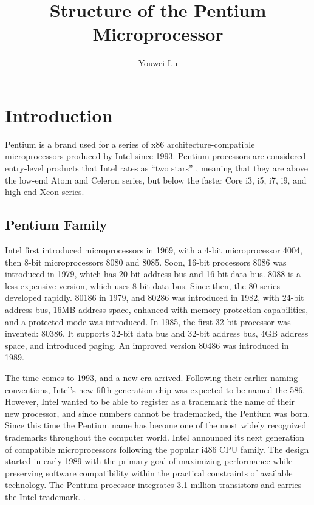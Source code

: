 \documentclass[doc,natbib,12pt]{apa6}
\title{Structure of the Pentium Microprocessor}
\author{Youwei Lu}
\affiliation{CISC 530-51- A-2018/Late Fall Assignment 2}
\begin{document}
	\maketitle
	
	\section{Introduction}
	
	Pentium is a brand used for a series of x86 architecture-compatible microprocessors produced by Intel since 1993. Pentium processors are considered entry-level products that Intel rates as ``two stars'' \citep{Hesseldahl2000}, meaning that they are above the low-end Atom and Celeron series, but below the faster Core i3, i5, i7, i9, and high-end Xeon series.
	
	\subsection{Pentium Family}
	Intel first introduced microprocessors in 1969, with a 4-bit microprocessor 4004, then 8-bit microprocessors 8080 and 8085. Soon, 16-bit processors 8086 was introduced in 1979, which has 20-bit address bus and 16-bit data bus. 8088 is a less expensive version, which uses 8-bit data bus. Since then, the 80 series developed rapidly. 80186 in 1979, and 80286 was introduced in 1982, with 24-bit address bus, 16MB address space, enhanced with memory protection capabilities, and a protected mode was introduced. In 1985, the first 32-bit processor was invented: 80386. It supports 32-bit data bus and 32-bit address bus, 4GB address space, and introduced paging. An improved version 80486 was introduced in 1989.
	
	The time comes to 1993, and a new era arrived. Following their earlier naming conventions, Intel’s new fifth-generation chip was expected to be named the 586. However, Intel wanted to be able to register as a trademark the name of their new processor, and since numbers cannot be trademarked, the Pentium was born. Since this time the Pentium name has become one of the most widely recognized trademarks throughout the computer world. Intel announced its next generation of compatible microprocessors following the popular i486 CPU family. The design started in early 1989 with the primary goal of maximizing performance while preserving software compatibility within the practical constraints of available technology. The Pentium processor integrates 3.1 million transistors and carries the Intel trademark. \citep{Alpert1993}.
	
\end{document}
